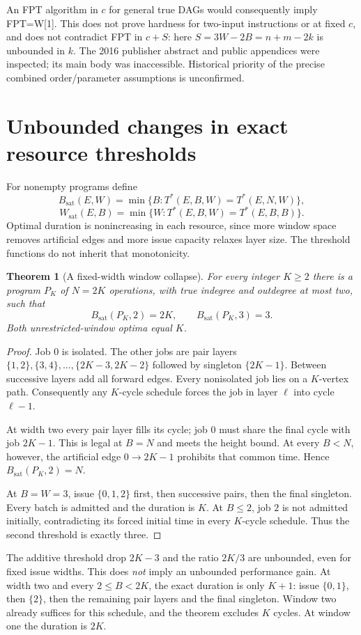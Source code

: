 \documentclass[11pt]{article}
\newtheorem{theorem}{Theorem}
\newcommand{\T}{T^*}
\newcommand{\bs}{B_{\mathrm{sat}}}
\newcommand{\ws}{W_{\mathrm{sat}}}
\begin{document}
An FPT algorithm in $c$ for general true DAGs would consequently imply
FPT=W[1]. This does not prove hardness for two-input instructions or at
fixed $c$, and does not contradict FPT in $c+S$: here
$S=3W-2B=n+m-2k$ is unbounded in $k$. The 2016 publisher abstract and public
appendices were inspected; its main body was inaccessible. Historical
priority of the precise combined order/parameter assumptions is unconfirmed.

\section{Unbounded changes in exact resource thresholds}
For nonempty programs define
\[
 \bs(E,W)=\min\{B:\T(E,B,W)=\T(E,N,W)\},
\]
\[
 \ws(E,B)=\min\{W:\T(E,B,W)=\T(E,B,B)\}.
\]
Optimal duration is nonincreasing in each resource, since more window space
removes artificial edges and more issue capacity relaxes layer size. The
threshold functions do not inherit that monotonicity.

\begin{theorem}[A fixed-width window collapse]
For every integer $K\ge2$ there is a program $P_K$ of $N=2K$ operations,
with true indegree and outdegree at most two, such that
\[
 \bs(P_K,2)=2K,\qquad \bs(P_K,3)=3.
\]
Both unrestricted-window optima equal $K$.
\end{theorem}
\begin{proof}
Job $0$ is isolated. The other jobs are pair layers
$\{1,2\},\{3,4\},\ldots,\{2K-3,2K-2\}$ followed by singleton
$\{2K-1\}$. Between successive layers add all forward edges. Every
nonisolated job lies on a $K$-vertex path. Consequently any $K$-cycle
schedule forces the job in layer $\ell$ into cycle $\ell-1$.

At width two every pair layer fills its cycle; job $0$ must share the final
cycle with job $2K-1$. This is legal at $B=N$ and meets the height bound.
At every $B<N$, however, the artificial edge $0\to2K-1$ prohibits that
common time. Hence $\bs(P_K,2)=N$.

At $B=W=3$, issue $\{0,1,2\}$ first, then successive pairs, then the final
singleton. Every batch is admitted and the duration is $K$. At $B\le2$,
job $2$ is not admitted initially, contradicting its forced initial time
in every $K$-cycle schedule. Thus the second threshold is exactly three.
\end{proof}

The additive threshold drop $2K-3$ and the ratio $2K/3$ are unbounded, even
for fixed issue widths. This does \emph{not} imply an unbounded performance
gain. At width two and every $2\le B<2K$, the exact duration is only $K+1$:
issue $\{0,1\}$, then $\{2\}$, then the remaining pair layers and the final
singleton. Window two already suffices for this schedule, and the theorem
excludes $K$ cycles. At window one the duration is $2K$.
\end{document}

